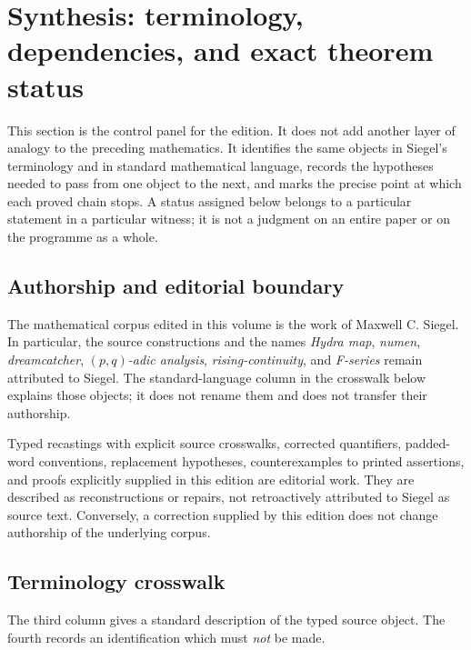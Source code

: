 \section{Synthesis: terminology, dependencies, and exact theorem status}
\label{sec:synthesis}

This section is the control panel for the edition.  It does not add another
layer of analogy to the preceding mathematics.  It identifies the same
objects in Siegel's terminology and in standard mathematical language,
records the hypotheses needed to pass from one object to the next, and marks
the precise point at which each proved chain stops.  A status assigned below
belongs to a particular statement in a particular witness; it is not a
judgment on an entire paper or on the programme as a whole.

\subsection{Authorship and editorial boundary}

\begin{status}
The mathematical corpus edited in this volume is the work of Maxwell C.
Siegel.  In particular, the source constructions and the names
\emph{Hydra map}, \emph{numen}, \emph{dreamcatcher},
\emph{$(p,q)$-adic analysis}, \emph{rising-continuity}, and
\emph{F-series} remain attributed to Siegel.  The standard-language column
in the crosswalk below explains those objects; it does not rename them and
does not transfer their authorship.

Typed recastings with explicit source crosswalks, corrected quantifiers,
padded-word conventions,
replacement hypotheses, counterexamples to printed assertions, and proofs
explicitly supplied in this edition are editorial work.  They are described
as reconstructions or repairs, not retroactively attributed to Siegel as
source text.  Conversely, a correction supplied by this edition does not
change authorship of the underlying corpus.
\end{status}

\subsection{Terminology crosswalk}

The third column gives a standard description of the typed source object.
The fourth records an identification which must \emph{not} be made.

